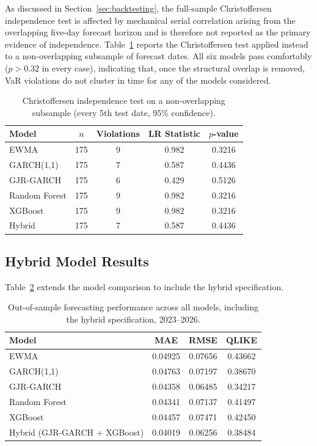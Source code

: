 \documentclass[12pt,a4paper]{article}
\begin{document}
As discussed in Section~\ref{sec:backtesting}, the full-sample Christoffersen independence test is
affected by mechanical serial correlation arising from the overlapping five-day forecast horizon and
is therefore not reported as the primary evidence of independence. Table~\ref{tab:christoffersen_nonoverlap}
reports the Christoffersen test applied instead to a non-overlapping subsample of forecast dates. All
six models pass comfortably ($p > 0.32$ in every case), indicating that, once the structural overlap
is removed, VaR violations do not cluster in time for any of the models considered.

\begin{table}[H]
\centering
\begin{tabular}{lcccc}
\toprule
Model          & $n$ & Violations & LR Statistic & $p$-value \\
\midrule
EWMA           & 175 & 9 & 0.982 & 0.3216 \\
GARCH(1,1)     & 175 & 7 & 0.587 & 0.4436 \\
GJR-GARCH      & 175 & 6 & 0.429 & 0.5126 \\
Random Forest  & 175 & 9 & 0.982 & 0.3216 \\
XGBoost        & 175 & 9 & 0.982 & 0.3216 \\
Hybrid         & 175 & 7 & 0.587 & 0.4436 \\
\bottomrule
\end{tabular}
\caption{Christoffersen independence test on a non-overlapping subsample (every 5th test date, 95\% confidence).}
\label{tab:christoffersen_nonoverlap}
\end{table}

\subsection{Hybrid Model Results}\label{sec:hybrid_results}
Table~\ref{tab:hybrid_comparison} extends the model comparison to include the hybrid specification.

\begin{table}[H]
\centering
\begin{tabular}{lccc}
\toprule
\textbf{Model} & \textbf{MAE} & \textbf{RMSE} & \textbf{QLIKE} \\
\midrule
EWMA          & 0.04925 & 0.07656 & 0.43662 \\
GARCH(1,1)    & 0.04763 & 0.07197 & 0.38670 \\
GJR-GARCH     & 0.04358 & 0.06485 & 0.34217 \\
Random Forest & 0.04341 & 0.07137 & 0.41497 \\
XGBoost       & 0.04457 & 0.07471 & 0.42450 \\
Hybrid (GJR-GARCH + XGBoost) & 0.04019 & 0.06256 & 0.38484 \\
\bottomrule
\end{tabular}
\caption{Out-of-sample forecasting performance across all models, including the hybrid specification, 2023--2026.}
\label{tab:hybrid_comparison}
\end{table}
\end{document}
